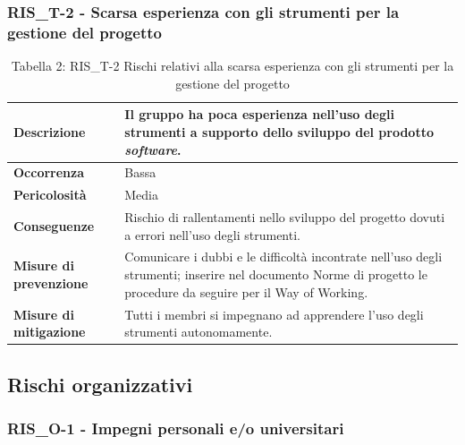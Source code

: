 \documentclass[a4paper,10pt]{article}
\begin{document}
\subsubsection{RIS\_T-2 - Scarsa esperienza con gli strumenti per la gestione del progetto}

\begin{table}[H]
\centering
\renewcommand{\arraystretch}{1.3}

\begin{tabularx}{\textwidth}{|p{4cm}|X|}
\hline
\textbf{Descrizione} & 
Il gruppo ha poca esperienza nell’uso degli strumenti a supporto dello sviluppo del prodotto \textit{software}. \\ \hline

\textbf{Occorrenza} & Bassa \\ \hline

\textbf{Pericolosità} & Media \\ \hline

\textbf{Conseguenze} & 
Rischio di rallentamenti nello sviluppo del progetto dovuti a errori nell'uso degli strumenti. \\ \hline

\textbf{Misure di prevenzione} & Comunicare i dubbi e le difficoltà incontrate nell’uso degli strumenti; inserire nel documento Norme di progetto le procedure da seguire per il Way of Working. \\ \hline

\textbf{Misure di mitigazione} &
Tutti i membri si impegnano ad apprendere l’uso degli strumenti autonomamente. \\ \hline

\end{tabularx}

\caption{Tabella 2: RIS\_T-2 Rischi relativi alla scarsa esperienza con gli strumenti per la gestione del progetto}
\end{table}

\subsection{Rischi organizzativi}
\subsubsection{RIS\_O-1 - Impegni personali e/o universitari}
\end{document}
